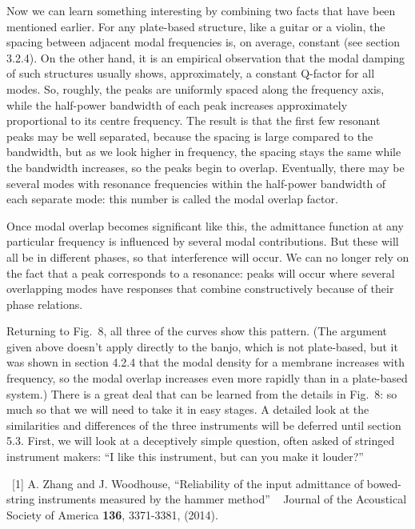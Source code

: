   Now we can learn something interesting by combining two facts that have been 
  mentioned earlier. For any plate-based structure, like a guitar or a violin, 
  the spacing between adjacent modal frequencies is, on average, constant (see 
  section 3.2.4). On the other hand, it is an empirical observation that the 
  modal damping of such structures usually shows, approximately, a constant 
  Q-factor for all modes. So, roughly, the peaks are uniformly spaced along the 
  frequency axis, while the half-power bandwidth of each peak increases 
  approximately proportional to its centre frequency. The result is that the 
  first few resonant peaks may be well separated, because the spacing is large 
  compared to the bandwidth, but as we look higher in frequency, the spacing 
  stays the same while the bandwidth increases, so the peaks begin to overlap. 
  Eventually, there may be several modes with resonance frequencies within the 
  half-power bandwidth of each separate mode: this number is called the modal 
  overlap factor. 

  Once modal overlap becomes significant like this, the admittance function at 
  any particular frequency is influenced by several modal contributions. But 
  these will all be in different phases, so that interference will occur. We 
  can no longer rely on the fact that a peak corresponds to a resonance: peaks 
  will occur where several overlapping modes have responses that combine 
  constructively because of their phase relations. 

  Returning to Fig.\ 8, all three of the curves show this pattern. (The 
  argument given above doesn't apply directly to the banjo, which is not 
  plate-based, but it was shown in section 4.2.4 that the modal density for a 
  membrane increases with frequency, so the modal overlap increases even more 
  rapidly than in a plate-based system.) There is a great deal that can be 
  learned from the details in Fig.\ 8: so much so that we will need to take it 
  in easy stages. A detailed look at the similarities and differences of the 
  three instruments will be deferred until section 5.3. First, we will look at 
  a deceptively simple question, often asked of stringed instrument makers: ``I 
  like this instrument, but can you make it louder?'' 



  ~[1] A. Zhang and J. Woodhouse, ``Reliability of the input admittance of 
  bowed-string instruments measured by the hammer method'' ~ Journal of the 
  Acoustical Society of America \textbf{136}, 3371-3381, (2014). 
